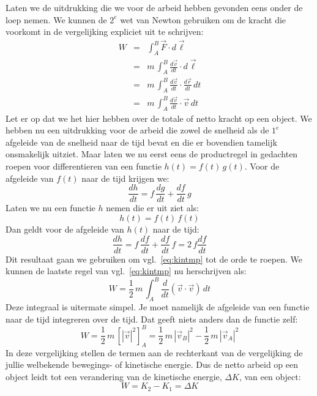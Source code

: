Laten we de uitdrukking die we voor de arbeid hebben gevonden eens onder de loep 
nemen. We kunnen de $2^e$ wet van Newton gebruiken om de kracht die voorkomt
in de vergelijking expliciet uit te schrijven:
\begin{eqnarray}
W & = & \int_A^B \vec{F}\cdot d\vec{\ell} \\
    &  = & m\,\int_A^B \frac{d\vec{v}}{dt}\cdot d\vec{\ell} \\
    & = & m\,\int_A^B \frac{d\vec{v}}{dt}\cdot\frac{d\vec{r}}{dt}\,dt \\
    & = & m\,\int_A^B \frac{d\vec{v}}{dt}\cdot\vec{v} \, dt \label{eq:kintmp}
\end{eqnarray}
Let er op dat we het hier hebben over de totale of netto kracht op een object.
We hebben nu een uitdrukking voor de arbeid die zowel de snelheid als de $1^e$ afgeleide 
van de snelheid naar de tijd bevat en die er bovendien tamelijk onsmakelijk uitziet. Maar
laten we nu eerst eens de productregel in gedachten roepen voor differentieren van 
een functie $h(t)=f(t)\,g(t)$. Voor de afgeleide van $f(t)$ naar de tijd krijgen we:
\begin{equation}
\frac{dh}{dt} = f \, \frac{dg}{dt} + \frac{df}{dt}\,g
\end{equation}
Laten we nu een functie $h$ nemen die er uit ziet als:
\begin{equation}
h(t) = f(t) \, f(t)
\end{equation}
Dan geldt voor de afgeleide van $h(t)$ naar de tijd:
\begin{equation}
\frac{dh}{dt} = f\,\frac{df}{dt} + \frac{df}{dt}\,f = 2\,f\frac{df}{dt}
\end{equation}
Dit resultaat gaan we gebruiken om  vgl.~\ref{eq:kintmp} tot de orde te roepen. We kunnen
de laatste regel van vgl.~\ref{eq:kintmp} nu herschrijven als:
\begin{equation}
W = \frac{1}{2}\,m\,\int_A^B\frac{d}{dt} \left( \vec{v} \cdot \vec{v} \right) \,dt
\end{equation}
Deze integraal is uitermate simpel. Je moet namelijk de afgeleide van een functie naar
de tijd integreren over de tijd. Dat geeft niets anders dan de functie zelf:
\begin{equation}
W = \frac{1}{2} \,m\,\left[|\vec{v}|^2\right]_A^B = 
\frac{1}{2}\,m\,|\vec{v}_B|^2 - \frac{1}{2}\,m\,|\vec{v}_A|^2
\end{equation} 
In deze vergelijking stellen de termen aan de rechterkant van de vergelijking de jullie 
welbekende bewegings- of kinetische energie. Dus de netto arbeid op een object leidt tot
een verandering van de kinetische energie, $\Delta K$,  van een object:
\begin{equation}
W = K_2 - K_1 = \Delta K
\end{equation}

